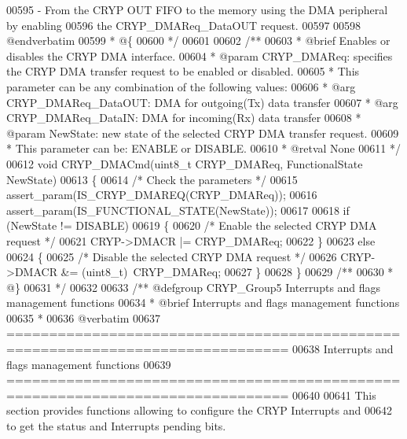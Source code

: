 \begin{DoxyCode}
00595 \textcolor{comment}{  - From the CRYP OUT FIFO to the memory using the DMA peripheral by enabling }
00596 \textcolor{comment}{    the CRYP\_DMAReq\_DataOUT request.}
00597 \textcolor{comment}{}
00598 \textcolor{comment}{@endverbatim}
00599 \textcolor{comment}{  * @\{}
00600 \textcolor{comment}{  */}
00601 
00602 \textcolor{comment}{/**}
00603 \textcolor{comment}{  * @brief  Enables or disables the CRYP DMA interface.}
00604 \textcolor{comment}{  * @param  CRYP\_DMAReq: specifies the CRYP DMA transfer request to be enabled or disabled.}
00605 \textcolor{comment}{  *           This parameter can be any combination of the following values:}
00606 \textcolor{comment}{  *            @arg CRYP\_DMAReq\_DataOUT: DMA for outgoing(Tx) data transfer}
00607 \textcolor{comment}{  *            @arg CRYP\_DMAReq\_DataIN: DMA for incoming(Rx) data transfer}
00608 \textcolor{comment}{  * @param  NewState: new state of the selected CRYP DMA transfer request.}
00609 \textcolor{comment}{  *          This parameter can be: ENABLE or DISABLE.}
00610 \textcolor{comment}{  * @retval None}
00611 \textcolor{comment}{  */}
00612 \textcolor{keywordtype}{void} CRYP_DMACmd(uint8\_t CRYP\_DMAReq, FunctionalState NewState)
00613 \{
00614   \textcolor{comment}{/* Check the parameters */}
00615   assert_param(IS\_CRYP\_DMAREQ(CRYP\_DMAReq));
00616   assert_param(IS\_FUNCTIONAL\_STATE(NewState));
00617 
00618   \textcolor{keywordflow}{if} (NewState != DISABLE)
00619   \{
00620     \textcolor{comment}{/* Enable the selected CRYP DMA request */}
00621     CRYP->DMACR |= CRYP\_DMAReq;
00622   \}
00623   \textcolor{keywordflow}{else}
00624   \{
00625     \textcolor{comment}{/* Disable the selected CRYP DMA request */}
00626     CRYP->DMACR &= (uint8\_t)~CRYP\_DMAReq;
00627   \}
00628 \}
00629 \textcolor{comment}{/**}
00630 \textcolor{comment}{  * @\}}
00631 \textcolor{comment}{  */}
00632 
00633 \textcolor{comment}{/** @defgroup CRYP\_Group5 Interrupts and flags management functions}
00634 \textcolor{comment}{ *  @brief   Interrupts and flags management functions}
00635 \textcolor{comment}{ *}
00636 \textcolor{comment}{@verbatim   }
00637 \textcolor{comment}{ ===============================================================================}
00638 \textcolor{comment}{                   Interrupts and flags management functions}
00639 \textcolor{comment}{ ===============================================================================  }
00640 \textcolor{comment}{}
00641 \textcolor{comment}{  This section provides functions allowing to configure the CRYP Interrupts and }
00642 \textcolor{comment}{  to get the status and Interrupts pending bits.}

\end{DoxyCode}
